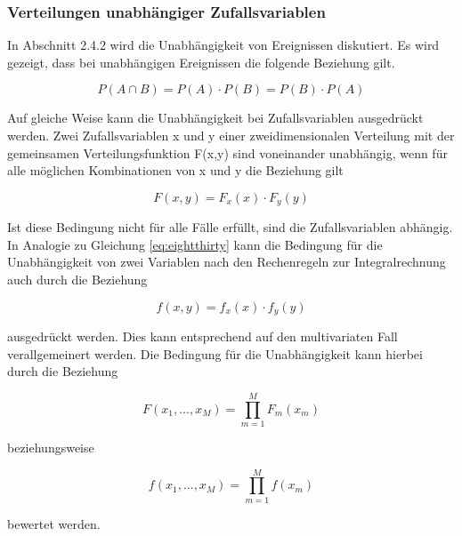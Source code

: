 \subsubsection{Verteilungen unabh\"{a}ngiger Zufallsvariablen}

\noindent In Abschnitt 2.4.2 wird die Unabh\"{a}ngigkeit von Ereignissen diskutiert. Es wird gezeigt, dass bei unabh\"{a}ngigen Ereignissen die folgende Beziehung gilt.

\begin{equation}\label{eq:eighttwentynine}
P(A\cap B)=P(A)\cdot P(B)=P(B)\cdot P(A)
\end{equation}

\noindent Auf gleiche Weise kann die Unabh\"{a}ngigkeit bei Zufallsvariablen ausgedr\"{u}ckt werden. Zwei Zufallsvariablen x und y einer zweidimensionalen Verteilung mit der gemeinsamen Verteilungsfunktion F(x,y) sind voneinander unabh\"{a}ngig, wenn f\"{u}r alle m\"{o}glichen Kombinationen von x und y die Beziehung gilt

\begin{equation}\label{eq:eightthirty}
F(x,y)=F_{x} (x)\cdot F_{y} (y)
\end{equation}

\noindent Ist diese Bedingung nicht f\"{u}r alle F\"{a}lle erf\"{u}llt, sind die Zufallsvariablen abh\"{a}ngig. In Analogie zu Gleichung \eqref{eq:eightthirty} kann die Bedingung f\"{u}r die Unabh\"{a}ngigkeit von zwei Variablen nach den Rechenregeln zur Integralrechnung auch durch die Beziehung

\begin{equation}\label{eq:eightthirtyone}
f(x,y)=f_{x} (x)\cdot f_{y} (y)
\end{equation}

\noindent ausgedr\"{u}ckt werden. Dies kann entsprechend auf den multivariaten Fall verallgemeinert werden. Die Bedingung f\"{u}r die Unabh\"{a}ngigkeit kann hierbei durch die Beziehung

\begin{equation}\label{eq:eightthirtytwo}
F(x_{1} ,...,x_{M})=\prod _{m=1}^{M}F_{m} (x_{m})
\end{equation}

\noindent beziehungsweise

\begin{equation}\label{eq:eightthirtythree}
f(x_{1} ,...,x_{M})=\prod _{m=1}^{M}f(x_{m} )
\end{equation}

\noindent bewertet werden.\bigskip

